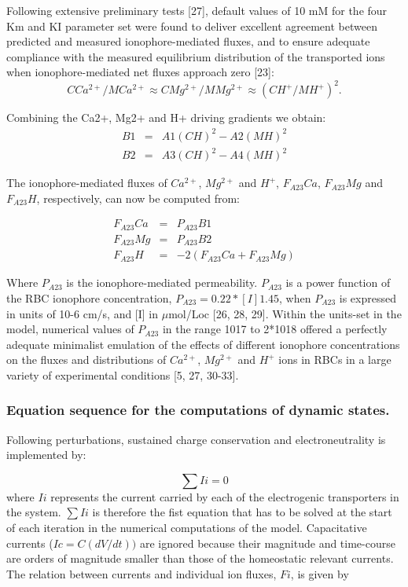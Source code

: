 \documentclass[a4paper]{article}
\newcommand{\med}[1]{M#1}
\newcommand{\cell}[1]{C#1}
\newcommand{\MCatp}{\med{Ca^{2+}}}
\newcommand{\MMgtp}{\med{Mg^{2+}}}
\newcommand{\MH}{\med{H}}
\newcommand{\CH}{\cell{H}}
\newcommand{\CMgtp}{\cell{Mg^{2+}}}
\newcommand{\CCatp}{\cell{Ca^{2+}}}
\newcommand{\F}[2]{F_{#1}#2}
\begin{document}
Following extensive preliminary tests [27], default values of 10 mM for the four Km and KI parameter set were found to deliver excellent agreement between predicted and measured ionophore-mediated fluxes, and to ensure adequate compliance with the measured equilibrium distribution of the transported ions when ionophore-mediated net fluxes approach zero [23]: 
\[\CCatp/\MCatp \approx \CMgtp/\MMgtp \approx (\CH^+/\MH^+)^2.\]

Combining the Ca2+, Mg2+ and H+ driving gradients we obtain:
\begin{eqnarray}
\nonumber B1&=& A1(\CH)^2 - A2(\MH)^2 \\
\nonumber B2&=& A3(\CH)^2 - A4(\MH)^2
\end{eqnarray}

The ionophore-mediated fluxes of $Ca^{2+}$, $Mg^{2+}$ and $H^+$, $\F{A23}{Ca}$, $\F{A23}{Mg}$ and $\F{A23}{H}$, respectively, can now be computed from: 

\setcounter{equation}{0}
\renewcommand{\theequation}{A23-\arabic{equation}}

\begin{eqnarray}
\F{A23}{Ca} &=& P_{A23}B1 \\
\F{A23}{Mg} &=& P_{A23}B2 \\
\F{A23}{H} &=& -2(\F{A23}{Ca} + \F{A23}{Mg})
\end{eqnarray}

Where $P_{A23}$ is the ionophore-mediated permeability. $P_{A23}$ is a power function of the RBC ionophore concentration, $P_{A23} = 0.22*[I]1.45$, when $P_{A23}$ is expressed in units of 10-6 cm/s, and [I] in $\mu$mol/Loc [26, 28, 29]. Within the units-set in the model, numerical values of $P_{A23}$ in the range 1017 to 2*1018 offered a perfectly adequate minimalist emulation of the effects of different ionophore concentrations on the fluxes and distributions of $Ca^{2+}$, $Mg^{2+}$ and $H^{+}$ ions in RBCs in a large variety of experimental conditions [5, 27, 30-33].    

\subsubsection{Equation sequence for the computations of dynamic states.}
Following perturbations, sustained charge conservation and electroneutrality is implemented by:

\setcounter{equation}{0}
\renewcommand{\theequation}{18\alph{equation}}

\begin{equation}
\sum Ii = 0 
\end{equation}
where $Ii$ represents the current carried by each of the electrogenic transporters in the system. $\sum Ii$ is therefore the fist equation that has to be solved at the start of each iteration in the numerical computations of the model. Capacitative currents ($Ic = C(dV/dt))$ are ignored because their magnitude and time-course are orders of magnitude smaller than those of the homeostatic relevant currents.  The relation between currents and individual ion fluxes, $Fi$, is given by 
\end{document}
